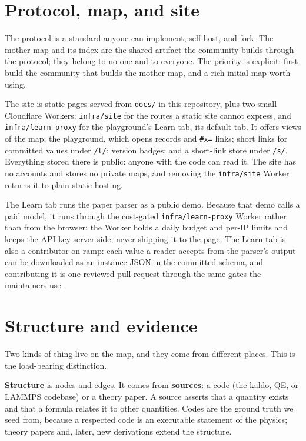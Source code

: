 \documentclass[11pt,a4paper]{article}
\begin{document}
\section{Protocol, map, and site}

The protocol is a standard anyone can implement, self-host, and fork. The
mother map and its index are the shared artifact the community builds through
the protocol; they belong to no one and to everyone. The priority is explicit:
first build the community that builds the mother map, and a rich initial map
worth using.

The site is static pages served from \texttt{docs/} in this repository, plus two
small Cloudflare Workers: \texttt{infra/site} for the routes a static site cannot
express, and \texttt{infra/learn-proxy} for the playground's Learn tab, its
default tab. It offers views of the map; the playground, which opens records and
\texttt{\#x=} links; short links for committed values under \texttt{/l/};
version badges; and a short-link store under \texttt{/s/}. Everything stored
there is public: anyone with the code can read it. The site has no accounts and
stores no private maps, and removing the \texttt{infra/site} Worker returns it to
plain static hosting.

The Learn tab runs the paper parser as a public demo. Because that demo calls a
paid model, it runs through the cost-gated \texttt{infra/learn-proxy} Worker
rather than from the browser: the Worker holds a daily budget and per-IP limits
and keeps the API key server-side, never shipping it to the page. The Learn tab
is also a contributor on-ramp: each value a reader accepts from the parser's
output can be downloaded as an instance JSON in the committed schema, and
contributing it is one reviewed pull request through the same gates the
maintainers use.

\section{Structure and evidence}

Two kinds of thing live on the map, and they come from different places. This
is the load-bearing distinction.

\textbf{Structure} is nodes and edges. It comes from \textbf{sources}: a code (the kaldo,
QE, or LAMMPS codebase) or a theory paper. A source asserts that a quantity
exists and that a formula relates it to other quantities. Codes are the ground
truth we seed from, because a respected code is an executable statement of the
physics; theory papers and, later, new derivations extend the structure.
\end{document}
